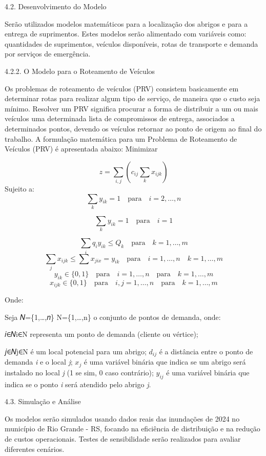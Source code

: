 \documentclass[
]{article}
\begin{document}
4.2. Desenvolvimento do Modelo

Serão utilizados modelos matemáticos para a localização dos abrigos e
para a entrega de suprimentos. Estes modelos serão alimentado com
variáveis como: quantidades de suprimentos, veículos disponíveis, rotas
de transporte e demanda por serviços de emergência.

4.2.2. O Modelo para o Roteamento de Veículos

Os problemas de roteamento de veículos (PRV) consistem basicamente em
determinar rotas para realizar algum tipo de serviço, de maneira que o
custo seja mínimo. Resolver um PRV significa procurar a forma de
distribuir a um ou mais veículos uma determinada lista de compromissos
de entrega, associados a determinados pontos, devendo os veículos
retornar ao ponto de origem ao final do trabalho. A formulação
matemática para um Problema de Roteamento de Veículos (PRV) é
apresentada abaixo: Minimizar

\[z=\sum_{i,j}(c_{ij}\sum_{k}x_{ijk})\] Sujeito a:
\[\sum_{k}y_{ik}=1 \quad \text{para} \quad  i=2, \dots,n\]

\[\sum_{k}y_{ik}=1\quad \text{para} \quad  i=1\]

\[\sum_{i}q_{i}y_{ik} \leq Q_{k} \quad \text{para} \quad  k=1, \dots,m\]
\[\sum_{j}x_{ijk} \leq\sum x_{jix}=y_{ik} \quad \text{para}\quad i=1,\dots,n\quad k=1,\dots,m\]
\[y_{ik} \in \{0,1\}\quad\text{para}\quad i=1,\dots,n\quad\text{para}\quad k=1,\dots,m\]
\[x_{ijk} \in \{0,1\}\quad\text{para}\quad i,j=1,\dots,n\quad\text{para}\quad k=1,\dots,m\]

Onde:

Seja 𝑁=\{1,\ldots,𝑛\} N=\{1,\ldots,n\} o conjunto de pontos de demanda,
onde:

𝑖∈𝑁i∈N representa um ponto de demanda (cliente ou vértice);

𝑗∈𝑁j∈N é um local potencial para um abrigo; \(d_{ij}\) é a distância
entre o ponto de demanda \emph{i} e o local \emph{j}; \(x_{j}\) é uma
variável binária que indica se um abrigo será instalado no local
\emph{j} (1 se sim, 0 caso contrário); \(y_{ij}\) é uma variável binária
que indica se o ponto \emph{i} será atendido pelo abrigo \emph{j}.

4.3. Simulação e Análise

Os modelos serão simulados usando dados reais das inundações de 2024 no
município de Rio Grande - RS, focando na eficiência de distribuição e na
redução de custos operacionais. Testes de sensibilidade serão realizados
para avaliar diferentes cenários.
\end{document}

